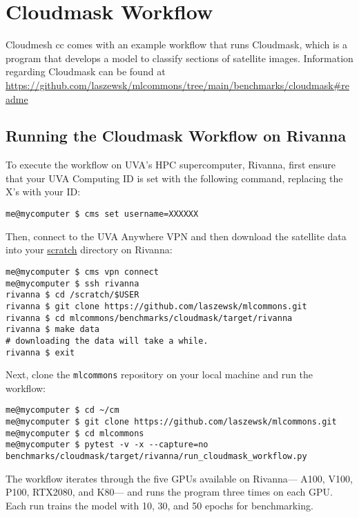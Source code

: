 \section{Cloudmask Workflow}\label{cloudmask-workflow}

Cloudmesh cc comes with an example workflow that runs Cloudmask, which
is a program that develops a model to classify sections of satellite
images. Information regarding Cloudmask can be found at
\url{https://github.com/laszewsk/mlcommons/tree/main/benchmarks/cloudmask\#readme}

\subsection{Running the Cloudmask Workflow on
Rivanna}\label{running-the-cloudmask-workflow-on-rivanna}

To execute the workflow on UVA's HPC supercomputer, Rivanna, first
ensure that your UVA Computing ID is set with the following command,
replacing the X's with your ID:

\begin{verbatim}
me@mycomputer $ cms set username=XXXXXX
\end{verbatim}

Then, connect to the UVA Anywhere VPN and then download the satellite
data into your
\href{https://www.rc.virginia.edu/userinfo/storage/non-sensitive-data/\#scratch}{scratch}
directory on Rivanna:

\bigbreak
\begin{verbatim}
me@mycomputer $ cms vpn connect
me@mycomputer $ ssh rivanna
rivanna $ cd /scratch/$USER
rivanna $ git clone https://github.com/laszewsk/mlcommons.git
rivanna $ cd mlcommons/benchmarks/cloudmask/target/rivanna
rivanna $ make data
# downloading the data will take a while.
rivanna $ exit
\end{verbatim}
\bigbreak

Next, clone the \texttt{mlcommons} repository on your local machine and
run the workflow:

\bigbreak
\begin{verbatim}
me@mycomputer $ cd ~/cm
me@mycomputer $ git clone https://github.com/laszewsk/mlcommons.git
me@mycomputer $ cd mlcommons
me@mycomputer $ pytest -v -x --capture=no benchmarks/cloudmask/target/rivanna/run_cloudmask_workflow.py
\end{verbatim}
\bigbreak

The workflow iterates through the five GPUs available on Rivanna---
A100, V100, P100, RTX2080, and K80--- and runs the program three times
on each GPU. Each run trains the model with 10, 30, and 50 epochs for
benchmarking.

